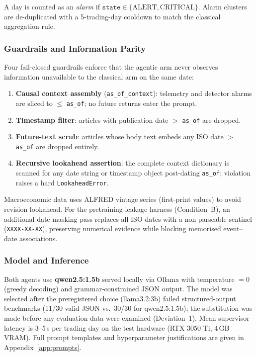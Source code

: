 \documentclass[11pt,a4paper]{article}
\begin{document}
  \noindent A day is counted as an \emph{alarm} if
  $\texttt{state} \in \{\text{ALERT}, \text{CRITICAL}\}$. Alarm clusters are
  de-duplicated with a 5-trading-day cooldown to match the classical aggregation
  rule.

  \subsubsection{Guardrails and Information Parity}\label{sec:guardrails}

  Four fail-closed guardrails enforce that the agentic arm never observes
  information unavailable to the classical arm on the same date:

  \begin{enumerate}
    \item \textbf{Causal context assembly} (\texttt{as\_of\_context}): telemetry
          and detector alarms are sliced to $\leq$ \texttt{as\_of}; no future
          returns enter the prompt.
    \item \textbf{Timestamp filter}: articles with publication date $>$
          \texttt{as\_of} are dropped.
    \item \textbf{Future-text scrub}: articles whose body text embeds any ISO
          date $>$ \texttt{as\_of} are dropped entirely.
    \item \textbf{Recursive lookahead assertion}: the complete context dictionary
          is scanned for any date string or timestamp object post-dating
          \texttt{as\_of}; violation raises a hard \texttt{LookaheadError}.
  \end{enumerate}

  \noindent Macroeconomic data uses ALFRED vintage series (first-print values) to
  avoid revision lookahead. For the pretraining-leakage harness (Condition~B), an
  additional date-masking pass replaces all ISO dates with a non-parseable
  sentinel (\texttt{XXXX-XX-XX}), preserving numerical evidence while blocking
  memorised event--date associations.

  \subsubsection{Model and Inference}\label{sec:model}

  Both agents use \textbf{qwen2.5:1.5b} served locally via Ollama with
  temperature $= 0$ (greedy decoding) and grammar-constrained JSON output. The
  model was selected after the preregistered choice (llama3.2:3b) failed
  structured-output benchmarks (11/30 valid JSON vs.\ 30/30 for qwen2.5:1.5b);
  the substitution was made before any evaluation data were examined
  (Deviation~1). Mean supervisor latency is 3--5\,s per trading day on the test
  hardware (RTX 3050 Ti, 4\,GB VRAM). Full prompt templates and hyperparameter
  justifications are given in Appendix~\ref{app:prompts}.
\end{document}
